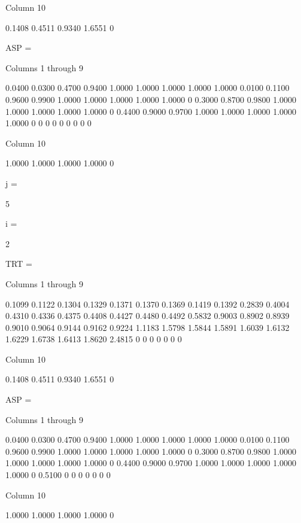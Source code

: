   Column 10

    0.1408
    0.4511
    0.9340
    1.6551
         0


ASP =

  Columns 1 through 9

    0.0400    0.0300    0.4700    0.9400    1.0000    1.0000    1.0000    1.0000    1.0000
    0.0100    0.1100    0.9600    0.9900    1.0000    1.0000    1.0000    1.0000    1.0000
         0    0.3000    0.8700    0.9800    1.0000    1.0000    1.0000    1.0000    1.0000
         0    0.4400    0.9000    0.9700    1.0000    1.0000    1.0000    1.0000    1.0000
         0         0         0         0         0         0         0         0         0

  Column 10

    1.0000
    1.0000
    1.0000
    1.0000
         0


j =

     5


i =

     2


TRT =

  Columns 1 through 9

    0.1099    0.1122    0.1304    0.1329    0.1371    0.1370    0.1369    0.1419    0.1392
    0.2839    0.4004    0.4310    0.4336    0.4375    0.4408    0.4427    0.4480    0.4492
    0.5832    0.9003    0.8902    0.8939    0.9010    0.9064    0.9144    0.9162    0.9224
    1.1183    1.5798    1.5844    1.5891    1.6039    1.6132    1.6229    1.6738    1.6413
    1.8620    2.4815         0         0         0         0         0         0         0

  Column 10

    0.1408
    0.4511
    0.9340
    1.6551
         0


ASP =

  Columns 1 through 9

    0.0400    0.0300    0.4700    0.9400    1.0000    1.0000    1.0000    1.0000    1.0000
    0.0100    0.1100    0.9600    0.9900    1.0000    1.0000    1.0000    1.0000    1.0000
         0    0.3000    0.8700    0.9800    1.0000    1.0000    1.0000    1.0000    1.0000
         0    0.4400    0.9000    0.9700    1.0000    1.0000    1.0000    1.0000    1.0000
         0    0.5100         0         0         0         0         0         0         0

  Column 10

    1.0000
    1.0000
    1.0000
    1.0000
         0


